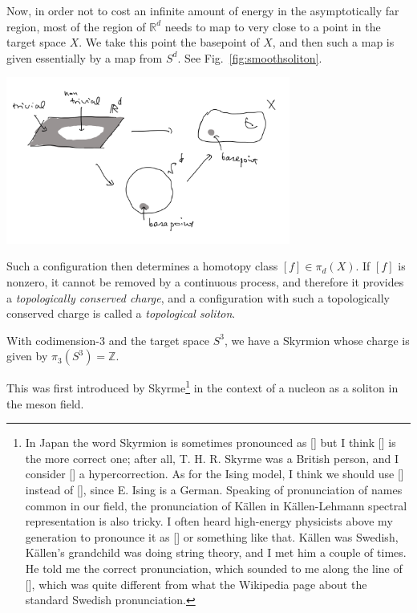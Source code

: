 \documentclass[12pt]{article}
\numberwithin{equation}{section}
\theoremstyle{remark}
\renewenvironment{figure}[1][]{
  \begin{originalfigure}[#1]
    \begin{mdframed}[linecolor=black!0,backgroundcolor=black!1]
}{
    \end{mdframed}
  \end{originalfigure}
}
\def\bR{\mathbb{R}}
\def\bZ{\mathbb{Z}}
\begin{document}
Now, in order not to cost an infinite amount of energy in the asymptotically far region,
most of the region of $\bR^d$ needs to map to very close to a point in the target space $X$.
We take this point the basepoint of $X$,
and then such a map is given essentially by a map from $S^d$.
See Fig.~\ref{fig:smoothsoliton}.


\begin{figure}[h]
\centering
  \includegraphics[width=0.7\textwidth]{smoothsoliton.png}
  \caption{A smooth, finite-energy, codimension-$d$ configuration is given by a map $S^d\to X$. }
  \label{fig:smoothsoliton}
\end{figure}

Such a configuration then determines a homotopy class $ [f]\in \pi_d(X)$.
If $[f]$ is nonzero, it cannot be removed by a continuous process,
and therefore it provides a \emph{topologically conserved charge},
and a configuration with such a topologically conserved charge is called a \emph{topological soliton}.

\begin{example}
With codimension-$3$ and the target space $S^3$, we have a Skyrmion whose charge is given by $\pi_3(S^3)=\bZ$.
\end{example}

This was first introduced by Skyrme\footnote{%
In Japan the word Skyrmion is sometimes pronounced as [] but I think [] is the more correct one;
after all, T. H. R. Skyrme was a British person, and I consider [] a hypercorrection.
As for the Ising model, I think we should use [] instead of [],
since E. Ising is a German.
Speaking of pronunciation of names common in our field, 
the pronunciation of K\"allen in K\"allen-Lehmann spectral representation is also tricky.
I often heard high-energy physicists above my generation to pronounce it as [] or something like that.
K\"allen was Swedish,
K\"allen's grandchild was doing string theory, and I met him a couple of times.
He told me the correct pronunciation, which sounded to me  along the line of [],
which was quite different from what the Wikipedia page about the standard Swedish pronunciation.
} \cite{Skyrme:1961vq,Skyrme:1962vh} in the context of a nucleon as a soliton in the meson field.
\end{document}
